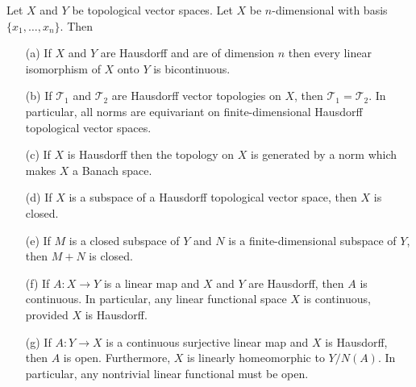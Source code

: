 \begin{theorem}\label{TVS finite dim prop}
Let $X$ and $Y$ be topological vector spaces. Let $X$ be $n$-dimensional with basis $\{x_1,\dots,x_n\}$. Then
\begin{itemize}
\item[(a)] If $X$ and $Y$ are Hausdorff and are of dimension $n$ then every linear isomorphism of $X$ onto $Y$ is bicontinuous.
\item[(b)] If $\mathcal{T}_1$ and $\mathcal{T}_2$ are Hausdorff vector topologies on $X$, then $\mathcal{T}_1=\mathcal{T}_2$. In particular, all norms are equivariant on finite-dimensional Hausdorff topological vector spaces.
\item[(c)] If $X$ is Hausdorff then the topology on $X$ is generated by a norm which makes $X$ a Banach space.
\item[(d)] If $X$ is a subspace of a Hausdorff topological vector space, then $X$ is closed.
\item[(e)] If $M$ is a closed subspace of $Y$ and $N$ is a finite-dimensional subspace of $Y$, then $M+N$ is closed.
\item[(f)] If $A:X\to Y$ is a linear map and $X$ and $Y$ are Hausdorff, then $A$ is continuous. In particular, any linear functional space $X$ is continuous, provided $X$ is Hausdorff.
\item[(g)] If $A:Y\to X$ is a continuous surjective linear map and $X$ is Hausdorff, then $A$ is open. Furthermore, $X$ is linearly homeomorphic to $Y/N(A)$. In particular, any nontrivial linear functional must be open.
\end{itemize}
\end{theorem}
